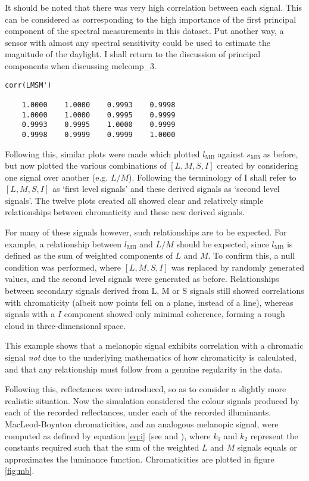 \documentclass{article}
\begin{document}
It should be noted that there was very high correlation between each signal. This can be considered as corresponding to the high importance of the first principal component of the spectral measurements in this dataset. Put another way, a sensor with almost any spectral sensitivity could be used to estimate the magnitude of the daylight. I shall return to the discussion of principal components when discussing melcomp\_3.

\begin{minipage}{\linewidth}
\begin{lstlisting}
corr(LMSM')

    1.0000    1.0000    0.9993    0.9998
    1.0000    1.0000    0.9995    0.9999
    0.9993    0.9995    1.0000    0.9999
    0.9998    0.9999    0.9999    1.0000
\end{lstlisting}
\end{minipage}

Following this, similar plots were made which plotted $l_{\text{MB}}$ against $s_{\text{MB}}$ as before, but now plotted the various combinations of $[L,M,S,I]$ created by considering one signal over another (e.g. $L/M$). Following the terminology of \cite{barrionuevo_contributions_2014} I shall refer to $[L,M,S,I]$ as `first level signals' and these derived signals as `second level signals'. The twelve plots created all showed clear and relatively simple relationships between chromaticity and these new derived signals.

For many of these signals however, such relationships are to be expected. For example, a relationship between $l_{\text{MB}}$ and $L/M$ should be expected, since $l_{\text{MB}}$ is defined as the sum of weighted components of $L$ and $M$. To confirm this, a null condition was performed, where $[L,M,S,I]$ was replaced by randomly generated values, and the second level signals were generated as before. Relationships between secondary signals derived from L, M or S signals still showed correlations with chromaticity (albeit now points fell on a plane, instead of a line), whereas signals with a $I$ component showed only minimal coherence, forming a rough cloud in three-dimensional space. 

This example shows that a melanopic signal exhibits correlation with a chromatic signal \emph{not} due to the underlying mathematics of how chromaticity is calculated, and that any relationship must follow from a genuine regularity in the data.

Following this, reflectances were introduced, so as to consider a slightly more realistic situation. Now the simulation considered the colour signals produced by each of the recorded reflectances, under each of the recorded illuminants. MacLeod-Boynton chromaticities, and an analogous melanopic signal, were computed as defined by equation \ref{eq:i} (see \cite{macleod_chromaticity_1979} and \cite{cie_cie_2015}), where $k_1$ and $k_2$ represent the constants required such that the sum of the weighted $L$ and $M$ signals equals or approximates the luminance function. Chromaticities are plotted in figure \ref{fig:mb}.
\end{document}

